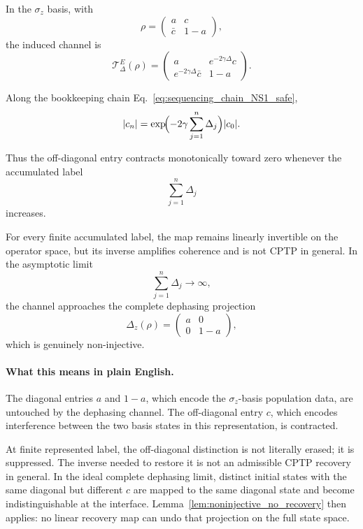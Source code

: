 \documentclass[aps,prx,onecolumn,11pt]{revtex4-2}
\theoremstyle{plain}
\theoremstyle{definition}
\theoremstyle{remark}
\begin{document}
In the \(\sigma_z\) basis, with
\[
\rho
=
\begin{pmatrix}
a & c\\
\bar c & 1-a
\end{pmatrix},
\]
the induced channel is
\begin{equation}
\mathcal T^E_{\Delta}(\rho)
=
\begin{pmatrix}
a & e^{-2\gamma\Delta}c\\
e^{-2\gamma\Delta}\bar c & 1-a
\end{pmatrix}.
\label{eq:dephasing_action_NS1_safe}
\end{equation}

Along the bookkeeping chain
Eq.~\eqref{eq:sequencing_chain_NS1_safe},
\begin{equation}
|c_n|
=
\exp\!\Bigl(
-2\gamma\sum_{j=1}^n\Delta_j
\Bigr)
|c_0|.
\label{eq:monotone_decay_NS1_safe}
\end{equation}

Thus the off-diagonal entry contracts monotonically toward zero whenever
the accumulated label
\[
\sum_{j=1}^n\Delta_j
\]
increases.

For every finite accumulated label, the map remains linearly invertible
on the operator space, but its inverse amplifies coherence and is not
CPTP in general. In the asymptotic limit
\[
\sum_{j=1}^n\Delta_j\to\infty,
\]
the channel approaches the complete dephasing projection
\[
\Delta_z(\rho)
=
\begin{pmatrix}
a & 0\\
0 & 1-a
\end{pmatrix},
\]
which is genuinely non-injective.

\paragraph{What this means in plain English.}

The diagonal entries \(a\) and \(1-a\), which encode the
\(\sigma_z\)-basis population data, are untouched by the dephasing
channel. The off-diagonal entry \(c\), which encodes interference
between the two basis states in this representation, is contracted.

At finite represented label, the off-diagonal distinction is not
literally erased; it is suppressed. The inverse needed to restore it is
not an admissible CPTP recovery in general. In the ideal complete
dephasing limit, distinct initial states with the same diagonal but
different \(c\) are mapped to the same diagonal state and become
indistinguishable at the interface. Lemma~\ref{lem:noninjective_no_recovery}
then applies: no linear recovery map can undo that projection on the
full state space.
\end{document}
